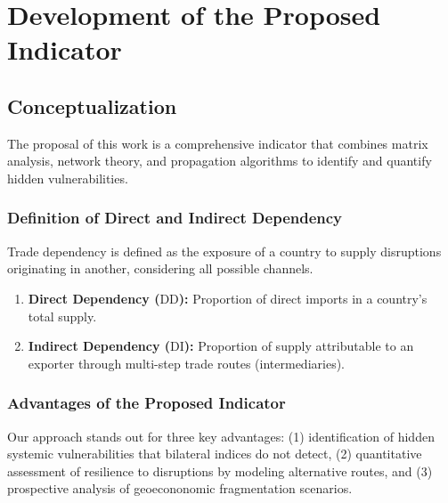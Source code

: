 \documentclass[final,1p,times,authoryear]{elsarticle}
\providecommand{\DD}{\mathrm{DD}}
\providecommand{\DI}{\mathrm{DI}}
\begin{document}
\section{Development of the Proposed Indicator}

\subsection{Conceptualization}
The proposal of this work is a comprehensive indicator that combines matrix analysis, network theory, and propagation algorithms to identify and quantify hidden vulnerabilities.

\subsubsection{Definition of Direct and Indirect Dependency}
Trade dependency is defined as the exposure of a country to supply disruptions originating in another, considering all possible channels.
\begin{enumerate}
    \item \textbf{Direct Dependency ($\DD$):} Proportion of direct imports in a country's total supply.
    \item \textbf{Indirect Dependency ($\DI$):} Proportion of supply attributable to an exporter through multi-step trade routes (intermediaries).
\end{enumerate}

\subsubsection{Advantages of the Proposed Indicator}
Our approach stands out for three key advantages: (1) identification of hidden systemic vulnerabilities that bilateral indices do not detect, (2) quantitative assessment of resilience to disruptions by modeling alternative routes, and (3) prospective analysis of geoecononomic fragmentation scenarios.
\end{document}
